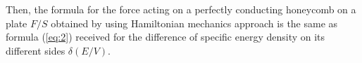 \documentclass[twoside, 10pt, ptm]{article}
\begin{document}
\begin{multicols}{2}

    Then, the formula for the force acting on a
perfectly conducting honeycomb on a plate \({F}/{S}\) obtained by using Hamiltonian mechanics approach is the same as formula (\ref{eq:2})
received for the difference of specific energy density on its
different sides \(\delta\left({E}/{V}\right)\).




\end{multicols}
\end{document}
